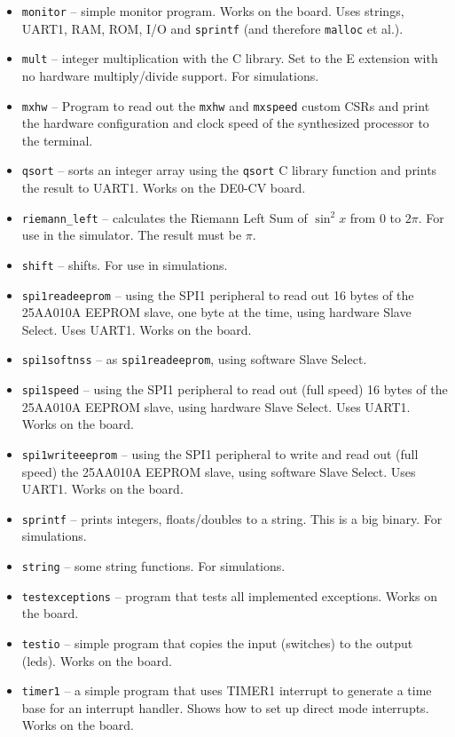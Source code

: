 \documentclass[12pt]{article}
\begin{document}
\begin{itemize}
\item \lstinline|monitor| -- simple monitor program. Works on the board. Uses strings, UART1, RAM, ROM, I/O and \lstinline|sprintf| (and therefore \lstinline|malloc| et al.).
\item \lstinline|mult| -- integer multiplication with the C library. Set to the E extension with no hardware multiply/divide support. For simulations.
\item \lstinline|mxhw| -- Program to read out the \lstinline|mxhw| and \lstinline|mxspeed| custom CSRs and print the hardware configuration and clock speed of the synthesized processor to the terminal.
\item \lstinline|qsort| -- sorts an integer array using the \lstinline|qsort| C library function and prints the result to UART1. Works on the DE0-CV board.
\item \lstinline|riemann_left| -- calculates the Riemann Left Sum of $\sin^2 x$ from $0$ to $2\pi$. For use in the simulator. The  result must be $\pi$.
\item \lstinline|shift| -- shifts. For use in simulations.
\item \lstinline|spi1readeeprom| -- using the SPI1 peripheral to read out 16 bytes of the 25AA010A EEPROM slave, one byte at the time, using hardware Slave Select. Uses UART1. Works on the board.
\item \lstinline|spi1softnss| -- as \lstinline|spi1readeeprom|, using software Slave Select.
\item \lstinline|spi1speed| -- using the SPI1 peripheral to read out (full speed) 16 bytes of the 25AA010A EEPROM slave, using hardware Slave Select. Uses UART1. Works on the board.
\item \lstinline|spi1writeeeprom| -- using the SPI1 peripheral to write and read out (full speed) the 25AA010A EEPROM slave, using software Slave Select. Uses UART1. Works on the board.
\item \lstinline|sprintf| -- prints integers, floats/doubles to a string. This is a big binary. For simulations.
\item \lstinline|string| -- some string functions. For simulations.
\item \lstinline|testexceptions| -- program that tests all implemented exceptions. Works on the board.
\item \lstinline|testio| -- simple program that copies the input (switches) to the output (leds). Works on the board.
\item \lstinline|timer1| -- a simple program that uses TIMER1 interrupt to generate a time base for an interrupt handler. Shows how to set up direct mode interrupts. Works on the board.

\end{itemize}
\end{document}
